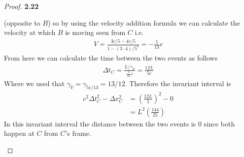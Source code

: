 \documentclass[11pt]{article}
\theoremstyle{definition}
\begin{document}
\begin{proof}{\textbf{2.22}}
\begin{itemize}
            (opposite to $B$) so by using the velocity addition formula we can calculate
            the velocity at which $B$ is moving seen from $C$ i.e.
            \begin{align*}
                V = \frac{3c/5 - 4c/5}{1 - (3\cdot 4)/5^2} = -\frac{5}{13}c 
            \end{align*}
            From here we can calculate the time between the two events as follows
            \begin{align*}
                \Delta t_C = \frac{L/\gamma_V}{\frac{5}{13}c} = \frac{12L}{5c}
            \end{align*}
            Where we used that $\gamma_V = \gamma_{5c/13} = 13/12$. Therefore the
            invariant interval is
            \begin{align*}
                c^2\Delta t_C^2 - \Delta x_C^2 &= (\frac{12L}{5})^2 - 0\\
                    &= L^2(\frac{144}{25})
            \end{align*}
            In this invariant interval the distance between the two events is 0 since
            both happen at $C$ from $C$'s frame.
        \end{itemize}
    \end{proof}
\end{document}
